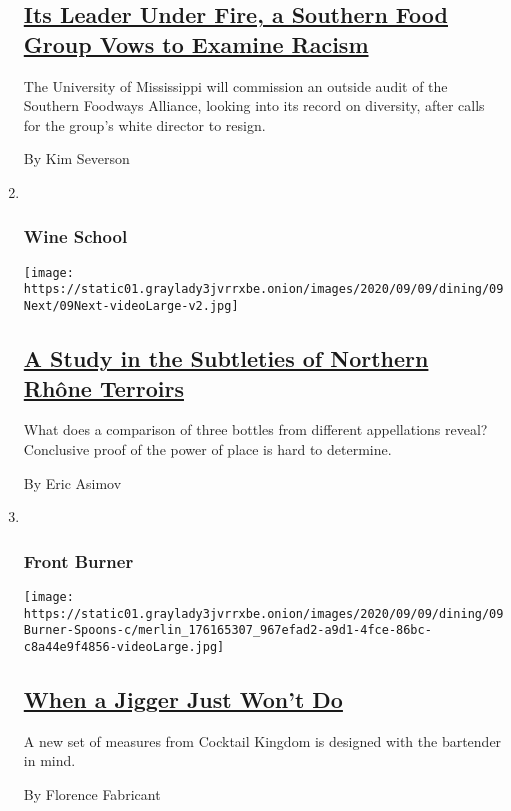 \begin{enumerate}
{  \subsection{\texorpdfstring{\href{/2020/09/02/dining/southern-foodways-alliance-audit.html}{Its
  Leader Under Fire, a Southern Food Group Vows to Examine
  Racism}}{Its Leader Under Fire, a Southern Food Group Vows to Examine Racism}}\label{its-leader-under-fire-a-southern-food-group-vows-to-examine-racism}}

  The University of Mississippi will commission an outside audit of the
  Southern Foodways Alliance, looking into its record on diversity,
  after calls for the group's white director to resign.

  By Kim Severson
\item ~
  \hypertarget{wine-school-1}{%
  \subsubsection{Wine School}\label{wine-school-1}}

  \texttt{[image: https://static01.graylady3jvrrxbe.onion/images/2020/09/09/dining/09Next/09Next-videoLarge-v2.jpg]}

  \hypertarget{a-study-in-the-subtleties-of-northern-rhuxf4ne-terroirs}{%
  \subsection{\texorpdfstring{\href{/2020/09/03/dining/drinks/wine-school-assignment-northern-rhone-reds.html}{A
  Study in the Subtleties of Northern Rhône
  Terroirs}}{A Study in the Subtleties of Northern Rhône Terroirs}}\label{a-study-in-the-subtleties-of-northern-rhuxf4ne-terroirs}}

  What does a comparison of three bottles from different appellations
  reveal? Conclusive proof of the power of place is hard to determine.

  By Eric Asimov
\item ~
  \hypertarget{front-burner}{%
  \subsubsection{Front Burner}\label{front-burner}}

  \texttt{[image: https://static01.graylady3jvrrxbe.onion/images/2020/09/09/dining/09Burner-Spoons-c/merlin\_176165307\_967efad2-a9d1-4fce-86bc-c8a44e9f4856-videoLarge.jpg]}

  \hypertarget{when-a-jigger-just-wont-do}{%
  \subsection{\texorpdfstring{\href{/2020/09/07/dining/drinks/cocktail-measuring-spoons.html}{When
  a Jigger Just Won't
  Do}}{When a Jigger Just Won't Do}}\label{when-a-jigger-just-wont-do}}

  A new set of measures from Cocktail Kingdom is designed with the
  bartender in mind.

  By Florence Fabricant
\end{enumerate}

